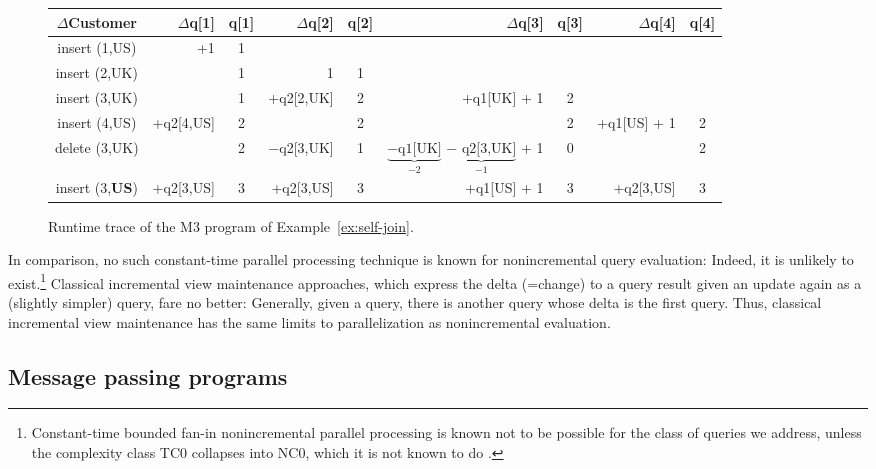 \begin{figure*}[!]
\begin{center}
\begin{tabular}{c|rc|rc|rc|rc}
$\Delta$Customer
& $\Delta$q[1] & q[1]
& $\Delta$q[2] & q[2]
& $\Delta$q[3] & q[3]
& $\Delta$q[4] & q[4] \\
\hline
insert (1,US) &         +1 & 1 &              &   &              &   &&   \\
insert (2,UK) &            & 1 &            1 & 1 &              &   &&   \\
insert (3,UK) &            & 1 &   +q2[2,UK] & 2 & +q1[UK] + 1 & 2 &&   \\
insert (4,US) & +q2[4,US] & 2 &              & 2 &              & 2 & +q1[US] + 1 & 2 \\
delete (3,UK) &            & 2 & $-$q2[3,UK] & 1 & $\underbrace{\mbox{$-$q1[UK]}}_{-2}$ $\underbrace{\mbox{$-$ q2[3,UK]}}_{-1}$ + 1 & 0 && 2 \\
insert (3,{\bf US}) & +q2[3,US] & 3 &   +q2[3,US] & 3 & +q1[US] + 1 & 3 & +q2[3,US] & 3  \\
\end{tabular}
\end{center}

\vspace{-4mm}

\caption{Runtime trace of the M3 program of Example~\ref{ex:self-join}.}
\label{fig:trace}
\end{figure*}


In comparison, no such constant-time parallel processing technique
is known for nonincremental query
evaluation: Indeed, it is unlikely to exist.\footnote{Constant-time
bounded fan-in nonincremental
parallel processing is known not to be possible for
the class of queries we address,
unless the complexity class TC0 collapses into NC0, which it is not known
to do \cite{Joh90}.} Classical incremental view maintenance approaches, which
express the delta (=change) to a query result given an update again
as a (slightly simpler) query, fare no better: Generally,
given a query, there is another query whose delta is the first query.
Thus, classical incremental view maintenance has the same limits to
parallelization as nonincremental evaluation.


\subsection{Message passing programs}


